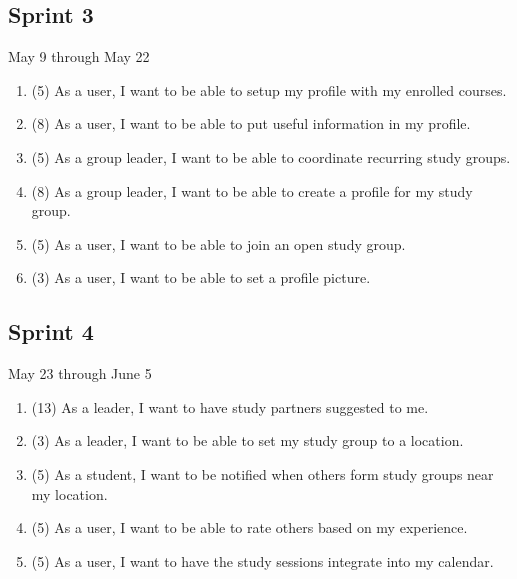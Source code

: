 \documentclass[10pt]{article}
\begin{document}
    \subsection{Sprint 3}
    May 9 through May 22
    \begin{enumerate}
        \item (5) As a user, I want to be able to setup my profile with my enrolled courses.
        \item (8) As a user, I want to be able to put useful information in my profile.
        \item (5) As a group leader, I want to be able to coordinate recurring study groups.
        \item (8) As a group leader, I want to be able to create a profile for my study group.
        \item (5) As a user, I want to be able to join an open study group.
        \item (3) As a user, I want to be able to set a profile picture.
    \end{enumerate}

    \subsection{Sprint 4}
    May 23 through June 5
    \begin{enumerate}
        \item (13) As a leader, I want to have study partners suggested to me.
        \item (3) As a leader, I want to be able to set my study group to a location.
        \item (5) As a student, I want to be notified when others form study groups near my location.
        \item (5) As a user, I want to be able to rate others based on my experience.
        \item (5) As a user, I want to have the study sessions integrate into my calendar.
    \end{enumerate}
\end{document}
